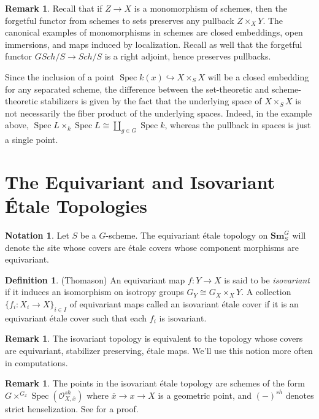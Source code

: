 \documentclass[edeposit,fullpage]{uiucthesis2009}
\newcommand{\mc}{\mathcal}
\newcommand{\Sm}[1]{\mathbf{Sm}_{#1}}
\DeclareMathOperator{\Spec}{Spec}
\theoremstyle{plain}
\numberwithin{lemma}{section}
\theoremstyle{definition}
\newtheorem{definition}[lemma]{Definition}
\newtheorem{notation}[lemma]{Notation}
\newtheorem{remark}[lemma]{Remark}
\begin{document}
\begin{remark}
Recall that if $Z \rightarrow X$ is a monomorphism of schemes, then
the forgetful functor from schemes to sets preserves any pullback $Z
\times_X Y$. The canonical examples of monomorphisms in schemes are
closed embeddings, open immersions, and maps induced by localization. Recall as well that the forgetful functor $GSch/S \rightarrow Sch/S$
is a right adjoint, hence preserves pullbacks.

Since the inclusion of a point $\Spec k(x) \hookrightarrow X \times_S X$
will be a closed embedding for any separated scheme, the difference
between the set-theoretic and scheme-theoretic stabilizers is given by
the fact that the underlying space of $X \times_S X$ is not
necessarily the fiber product of the underlying spaces. Indeed, in the
example above, $\Spec L \times_k \Spec L \cong \coprod_{g \in G} \Spec
k$, whereas the pullback in spaces is just a single point. 
\end{remark}

\section{The Equivariant and Isovariant \'Etale Topologies}

\begin{notation}
Let $S$ be a  $G$-scheme. The equivariant \'etale topology on $\Sm{S}^{G}$
will denote the site whose covers are \'etale covers whose component
morphisms are equivariant.
\end{notation}

\begin{definition} (Thomason)
An equivariant map $f : Y \rightarrow X$ is said to be
\emph{isovariant} if it induces an isomorphism on isotropy groups $G_Y \cong G_X \times_X
Y$. A collection $\{f_i : X_i \rightarrow X\}_{i \in I}$ of
equivariant maps called an isovariant \'etale cover if it is an
equivariant \'etale cover such that each $f_i$ is isovariant. 
\end{definition}

\begin{remark}
The isovariant topology is equivalent to the topology whose covers are
equivariant, stabilizer preserving, \'etale maps. We'll use this
notion more often in computations. 
\end{remark}

\begin{remark}
The points in the isovariant \'etale topology are schemes of the form
$G \times^{G_x} \Spec(\mc O^{sh}_{X,\overline x})$ where $\overline x
\rightarrow x \rightarrow X$ is a geometric point, and $(-)^{sh}$ denotes
strict henselization. See \cite{GrpSchHell} for a proof.
\end{remark}
\end{document}
